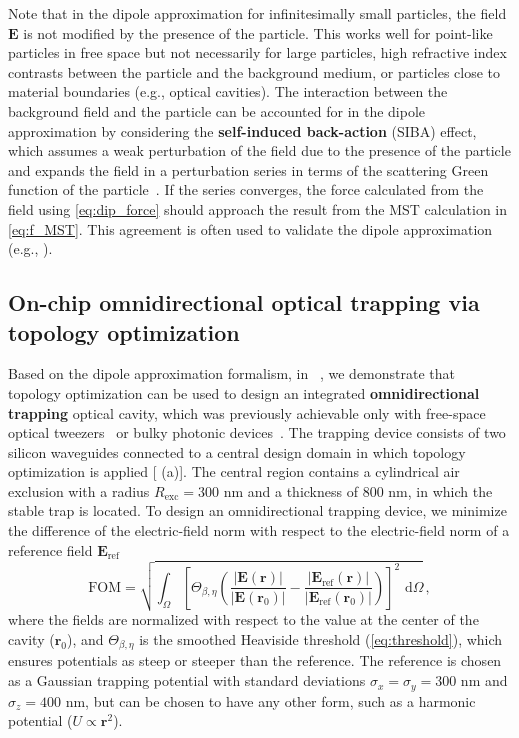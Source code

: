 Note that in the dipole approximation for infinitesimally small particles, the field $\mathbf{E}$ is not modified by the presence of the particle.
This works well for point-like particles in free space but not necessarily 
for large particles, high refractive index contrasts between the particle and the background medium, or particles close to material
boundaries (e.g., optical cavities). The interaction between the background field and the particle can be accounted for in the dipole
approximation by considering the \textbf{self-induced back-action} (SIBA) effect, which assumes a weak
perturbation of the field due to the presence of the particle and expands the field in a perturbation series in terms of 
the scattering Green function of the particle~\cite{novotny, SIBA, benjamin}. If the series converges, the force calculated from the field 
using \eqref{eq:dip_force} should approach the result from the MST calculation in \eqref{eq:f_MST}. 
This agreement is often used to validate the dipole approximation (e.g., \cite{ownpub1,ownpub3}).

\subsection*{On-chip omnidirectional optical trapping via topology optimization~\cite{ownpub1}}

Based on the dipole approximation formalism, in ~\cite{ownpub1}, we demonstrate that topology optimization can be used to design an integrated \textbf{omnidirectional trapping} optical cavity, which was previously achievable only with free-space optical tweezers~\cite{ashkin_acceleration_1970} or bulky photonic devices~\cite{manka_simulation_2024}. The trapping device
consists of two silicon waveguides connected to a central design domain in which
topology optimization is applied [ (a)]. The central region contains a cylindrical air exclusion with a radius
$R_\text{exc}=300$ nm and a thickness of $800$ nm, in which the stable trap is located.
To design an omnidirectional trapping device, we minimize  
the difference of the electric-field norm with respect to the electric-field norm of a reference field $\mathbf{E}_\text{ref}$
\begin{equation}
 \text{FOM} =\sqrt{\int_{\Omega}\left[\Theta_{\beta,\eta}\left(\frac{|\mathbf{E}(\mathbf{r})|}{\left|\mathbf{E}\left(\mathbf{r}_0\right)\right|}-\frac{\left|\mathbf{E}_{\text{ref}}(\mathbf{r})\right|}{\left|\mathbf{E}_{\text{ref}}\left(\mathbf{r}_0\right)\right|}\right)\right]^2 \text{~d} \Omega}\,,
    \end{equation}
where the fields are normalized with respect to the value at the center of the cavity ($\mathbf{r}_0$), and $\Theta_{\beta,\eta}$ is the smoothed Heaviside threshold (\eqref{eq:threshold}), which ensures
potentials as steep or steeper than the reference. The reference is chosen as a Gaussian trapping potential with standard deviations $\sigma_x=\sigma_y=300$ nm and $\sigma_z=400$ nm, but can be chosen to have any other form, such as a harmonic potential ($U\propto\mathbf{r}^2$).

